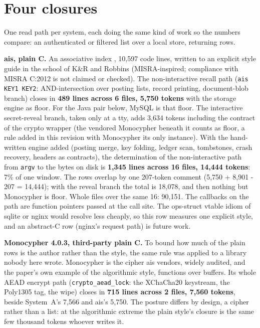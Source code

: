 \documentclass[journal]{IEEEtran}
\begin{document}
\section{Four closures}
\label{sec:closures}

One read path per system, each doing the same kind of work so the numbers
compare: an authenticated or filtered list over a local store, returning
rows.

\textbf{ais, plain C.} An associative index \cite{ais}, 10,597 code lines,
written to an explicit style guide \cite{aisstyle} in the school of K\&R
and Robbins \cite{knr,robbins} (MISRA-inspired; compliance with MISRA C:2012
\cite{misra} is not claimed or checked). The non-interactive recall path
(\texttt{ais KEY1 KEY2}: AND-intersection over posting lists, record
printing, document-blob branch) closes in \textbf{489 lines across 6 files,
5,750 tokens} with the storage engine as floor. For the Java pair below, MySQL is
that floor. The interactive secret-reveal branch, taken only at a tty,
adds 3,634 tokens including the contract of the crypto wrapper (the
vendored Monocypher beneath it counts as floor, a rule added in this
revision with Monocypher its only instance). With the hand-written engine
added (posting merge, key folding, ledger scan, tombstones, crash
recovery, headers as contracts), the determination of the non-interactive path from
\texttt{argv} to the bytes on disk is \textbf{1,345 lines across 16 files,
14,444 tokens}: 7\% of one window. The rows overlap by one 207-token
comment (5,750 + 8,901 - 207 = 14,444); with the reveal branch the total is
18,078, and then nothing but Monocypher is floor. Whole files over the same
16: 90,151. The callbacks on the path are function pointers passed at the
call site. The ops-struct vtable idiom of sqlite or nginx would resolve less
cheaply, so this row measures one explicit style, and an abstract-C row
(nginx's request path) is future work.

\textbf{Monocypher 4.0.3, third-party plain C.} To bound how much of the
plain rows is the author rather than the style, the same rule was applied
to a library nobody here wrote. Monocypher \cite{monocypher} is the cipher
ais vendors, widely audited, and the paper's own example of the
algorithmic style, functions over buffers. Its whole AEAD encrypt path
(\texttt{crypto\_aead\_lock}: the XChaCha20 keystream, the Poly1305
tag, the wipe) closes in \textbf{715 lines across 2 files, 7,560
tokens}, beside System~A's 7,566 and ais's 5,750. The posture differs by
design, a cipher rather than a list: at the
algorithmic extreme the plain style's closure is the same few thousand
tokens whoever writes it.
\end{document}
